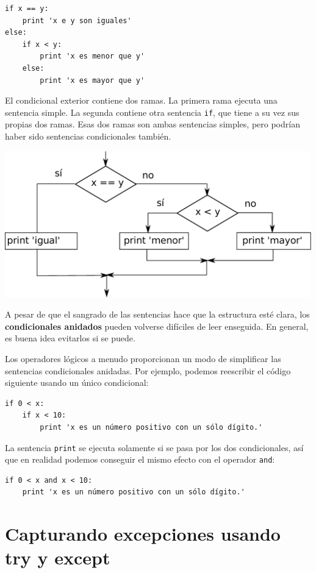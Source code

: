\beforeverb
\begin{verbatim}
if x == y:
    print 'x e y son iguales'
else:
    if x < y:
        print 'x es menor que y'
    else:
        print 'x es mayor que y'
\end{verbatim}
\afterverb
%
El condicional exterior contiene dos ramas. La
primera rama ejecuta una sentencia simple. La segunda
contiene otra sentencia {\tt if}, que tiene a su vez sus propias
dos ramas. Esas dos ramas son ambas sentencias simples,
pero podrían haber sido sentencias condicionales también.

\beforefig
\centerline{\includegraphics[height=2.50in]{figs2/nested.eps}}
\afterfig

A pesar de que el sangrado de las sentencias hace que la estructura
esté clara, los {\bf condicionales anidados} pueden volverse difíciles
de leer enseguida. En general, es buena idea evitarlos si se puede.

Los operadores lógicos a menudo proporcionan un modo de simplificar las
sentencias condicionales anidadas. Por ejemplo, podemos reescribir el código
siguiente usando un único condicional:

\beforeverb
\begin{verbatim}
if 0 < x:
    if x < 10:
        print 'x es un número positivo con un sólo dígito.'
\end{verbatim}
\afterverb
%
La sentencia {\tt print} se ejecuta solamente si se pasa por los dos
condicionales, así que en realidad podemos conseguir el mismo efecto con el operador {\tt and}:

\beforeverb
\begin{verbatim}
if 0 < x and x < 10:
    print 'x es un número positivo con un sólo dígito.'
\end{verbatim}
\afterverb


\section{Capturando excepciones usando try y except}
\label{catch1}

